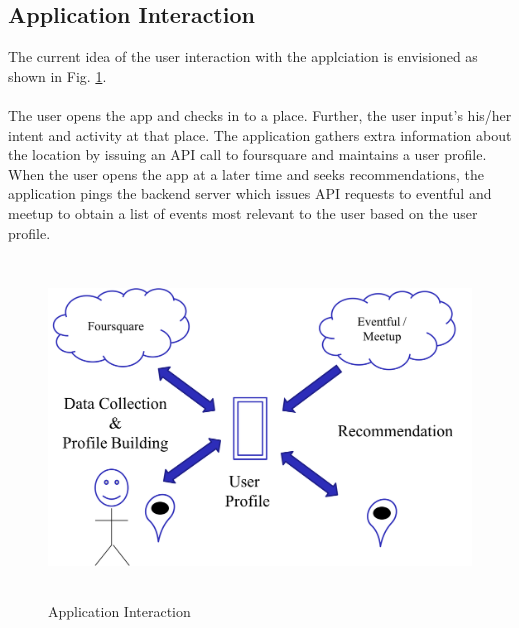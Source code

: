 \documentclass[12pt,letterpaper]{article}
\begin{document}
\subsection{Application Interaction}
The current idea of the user interaction with the applciation is envisioned as shown in Fig. \ref{fig:appinter}.
\\\\
The user opens the app and checks in to a place. Further, the user input's his/her intent and activity at that place. The application gathers extra information about the location by issuing an API call to foursquare and maintains a user profile. When the user opens the app at a later time and seeks recommendations, the application pings the backend server which issues API requests to eventful and meetup to obtain a list of events most relevant to the user based on the user profile.
\begin{figure}[H]
	\centering
	 \includegraphics[width=\textwidth, height=9cm]{img/appinter.png}
	 \caption{Application Interaction}
  	 \label{fig:appinter}
\end{figure}
\end{document}
